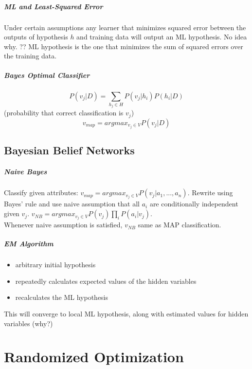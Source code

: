 \documentclass[11pt]{article}
\begin{document}
\subparagraph{ML and Least-Squared Error}
Under certain assumptions any learner that minimizes squared error between the outputs of hypothesis $h$ and training data will output an ML hypothesis. No idea why. ?? ML hypothesis is the one that minimizes the sum of squared errors over the training data.

\subparagraph{Bayes Optimal Classifier}
$$P(v_j |D) = \sum_{h_j \in H}{P(v_j|h_i) P(h_i|D)}$$ (probability that correct classification is $v_j$)\\
$$v_{map} = argmax_{v_j \in V} P(v_j|D)$$

\subsection{Bayesian Belief Networks}
\subparagraph{Naive Bayes} Classify given attributes: $v_{map} = argmax_{v_j \in V} P(v_j|a_1,...,a_n)$. Rewrite using Bayes' rule and use naive assumption that all $a_i$ are conditionally independent given $v_j$. $v_{NB} = argmax_{v_j \in V} P(v_j) \prod_{i}{P(a_i|v_j)}$.\\
Whenever naive assumption is satisfied, $v_{NB}$ same as MAP classification.
\subparagraph{EM Algorithm}
\begin{itemize}
\item arbitrary initial hypothesis
\item repeatedly calculates expected values of the hidden variables
\item recalculates the ML hypothesis
\end{itemize}
This will converge to local ML hypothesis, along with estimated values for hidden variables (why?)



\section{Randomized Optimization}
\end{document}
